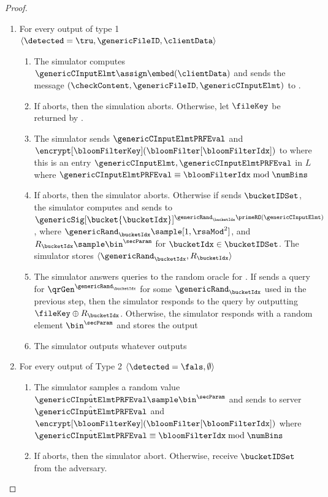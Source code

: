 \begin{proof}
\begin{itemize}
\begin{enumerate}[resume]
\item For every output of type 1 $\langle \detected = \tru, \genericFileID, \clientData \rangle$
\begin{enumerate}
\item The simulator computes $\genericCInputElmt \assign \embed(\clientData)$ and sends the message $(\checkContent, \genericFileID, \genericCInputElmt)$ to \contentModFunc. 
\item If \contentModFunc aborts, then the simulation aborts. Otherwise, let $\fileKey$ be returned by \contentModFunc. 
\item The simulator sends $\genericCInputElmtPRFEval$ and $\encrypt[\bloomFilterKey](\bloomFilter[\bloomFilterIdx])$ to \server where this is an entry $\genericCInputElmt, \genericCInputElmtPRFEval$ in $L$ where $\genericCInputElmtPRFEval \equiv \bloomFilterIdx \bmod \numBins$ 
\item If \server aborts, then the simulator aborts. Otherwise if \server sends $\bucketIDSet$, the simulator computes and sends to \server $\genericSig[\bucket{\bucketIdx}]^{\genericRand_\bucketIdx \primeRO(\genericCInputElmt)}$, where $\genericRand_\bucketIdx \sample [1, \rsaMod^2]$, and $R_\bucketIdx \sample \bin^{\secParam}$ for $\bucketIdx \in \bucketIDSet$. The simulator stores $\langle \genericRand_\bucketIdx, R_\bucketIdx \rangle$
\item The simulator answers queries to the random oracle \ro for \server. If \server sends a query for $\qrGen^{\genericRand_\bucketIdx}$ for some $\genericRand_\bucketIdx$ used in the previous step, then the simulator responds to the query by outputting $\fileKey \oplus R_\bucketIdx$. Otherwise, the simulator responds with a random element $\bin^{\secParam}$ and stores the output
\item The simulator outputs whatever \server outputs
\end{enumerate}
\item For every output of Type 2 $\langle \detected = \fals, \emptyset \rangle$
\begin{enumerate}
\item The simulator samples a random value $\hat{\genericCInputElmtPRFEval} \sample \bin^{\secParam}$ and sends to server $\hat{\genericCInputElmtPRFEval}$ and $\encrypt[\bloomFilterKey](\bloomFilter[\bloomFilterIdx])$ where $\hat{\genericCInputElmtPRFEval} \equiv \bloomFilterIdx \bmod \numBins$ 
\item If \server aborts, then the simulator abort. Otherwise, receive $\bucketIDSet$ from the adversary. 

\end{enumerate}
\end{enumerate}
\end{itemize}
\end{proof}
